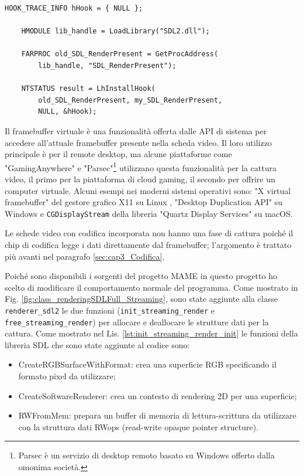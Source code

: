 \begin{lstlisting}[caption=Codice di hook per la libreria SDL, label={lst:hookCode}]
	HOOK_TRACE_INFO hHook = { NULL };
	
	HMODULE lib_handle = LoadLibrary("SDL2.dll");

	FARPROC old_SDL_RenderPresent =	GetProcAddress(
		lib_handle, "SDL_RenderPresent");

	NTSTATUS result = LhInstallHook(
		old_SDL_RenderPresent, my_SDL_RenderPresent,
		NULL, &hHook);
\end{lstlisting}

Il framebuffer virtuale è una funzionalità offerta dalle API di sistema per accedere all'attuale framebuffer presente nella scheda video. Il loro utilizzo principale è per il remote desktop, ma alcune piattaforme come "GamingAnywhere" \parencite{GamingAnywhere} e "Parsec"\footnote{Parsec è un servizio di desktop remoto basato su Windows offerto dalla omonima società.} \parencite{TheTechnologyBehindALowLatencyCloudGamingService} utilizzano questa funzionalità per la cattura video, il primo per la piattaforma di cloud gaming, il secondo per offrire un computer virtuale. Alcuni esempi nei moderni sistemi operativi sono: "X virtual framebuffer" del gestore grafico X11 su Linux \parencite{XVFB}, "Desktop Duplication API" su Windows \parencite{DesktopDuplicationAPI} e \verb|CGDisplayStream| della libreria "Quartz Display Services" su macOS.

Le schede video con codifica incorporata non hanno una fase di cattura poiché il chip di codifica legge i dati direttamente dal framebuffer; l'argomento è trattato più avanti nel paragrafo \ref{sec:cap3_Codifica}.

Poiché sono disponibili i sorgenti del progetto MAME in questo progetto ho scelto di modificare il comportamento normale del programma. Come mostrato in Fig. \ref{fig:class_renderingSDLFull_Streaming}, sono state aggiunte alla classe \verb|renderer_sdl2| le due funzioni (\verb|init_streaming_render| e \verb|free_streaming_render|) per allocare e deallocare le strutture dati per la cattura. Come mostrato nel Lis. \ref{lst:init_streaming_render_init} le funzioni della libreria SDL che sono state aggiunte al codice sono:

\begin{itemize}
	\item CreateRGBSurfaceWithFormat: crea una superficie RGB specificando il formato pixel da utilizzare;	
	\item CreateSoftwareRenderer: crea un contesto di rendering 2D per una superficie;
	\item RWFromMem: prepara un buffer di memoria di lettura-scrittura da utilizzare con la struttura dati RWops (read-write opaque pointer structure).	
\end{itemize}

